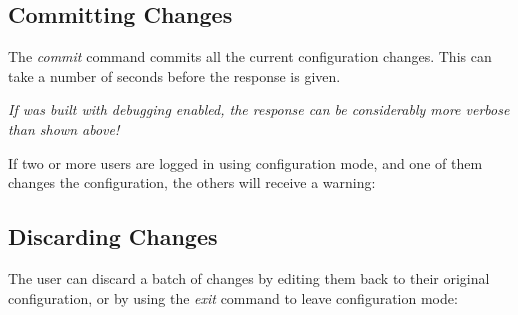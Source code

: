 \newpage
\subsection{Committing Changes}

\noindent{}
\vspace{0.1in}

The \emph{commit} command commits all the current configuration changes.
This can take a number of seconds before the response is given.

{\it If \xorpsh was built with debugging enabled, the response can be
considerably more verbose than shown above!}

If two or more users are logged in using configuration mode, and one
of them changes the configuration, the others will receive a warning:
\vspace{0.1in}

\noindent{}
\vspace{0.1in}


\subsection{Discarding Changes}

The user can discard a batch of changes by editing them back to their
original configuration, or by using the \emph{exit} command to leave
configuration mode:
\vspace{0.1in}

